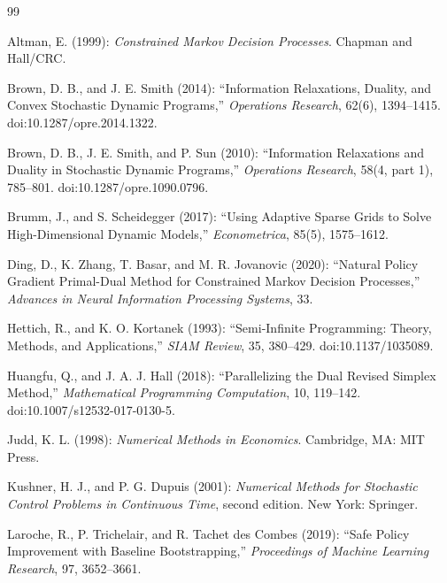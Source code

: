 \begin{thebibliography}{99}

Altman, E. (1999): \emph{Constrained Markov Decision Processes}. Chapman and Hall/CRC.

Brown, D. B., and J. E. Smith (2014): ``Information Relaxations, Duality, and Convex Stochastic Dynamic Programs,'' \emph{Operations Research}, 62(6), 1394--1415. doi:10.1287/opre.2014.1322.

Brown, D. B., J. E. Smith, and P. Sun (2010): ``Information Relaxations and Duality in Stochastic Dynamic Programs,'' \emph{Operations Research}, 58(4, part 1), 785--801. doi:10.1287/opre.1090.0796.

Brumm, J., and S. Scheidegger (2017): ``Using Adaptive Sparse Grids to Solve High-Dimensional Dynamic Models,'' \emph{Econometrica}, 85(5), 1575--1612.

Ding, D., K. Zhang, T. Basar, and M. R. Jovanovic (2020): ``Natural Policy Gradient Primal-Dual Method for Constrained Markov Decision Processes,'' \emph{Advances in Neural Information Processing Systems}, 33.

Hettich, R., and K. O. Kortanek (1993): ``Semi-Infinite Programming: Theory, Methods, and Applications,'' \emph{SIAM Review}, 35, 380--429. doi:10.1137/1035089.

Huangfu, Q., and J. A. J. Hall (2018): ``Parallelizing the Dual Revised Simplex Method,'' \emph{Mathematical Programming Computation}, 10, 119--142. doi:10.1007/s12532-017-0130-5.

Judd, K. L. (1998): \emph{Numerical Methods in Economics}. Cambridge, MA: MIT Press.

Kushner, H. J., and P. G. Dupuis (2001): \emph{Numerical Methods for Stochastic Control Problems in Continuous Time}, second edition. New York: Springer.

Laroche, R., P. Trichelair, and R. Tachet des Combes (2019): ``Safe Policy Improvement with Baseline Bootstrapping,'' \emph{Proceedings of Machine Learning Research}, 97, 3652--3661.


\end{thebibliography}

